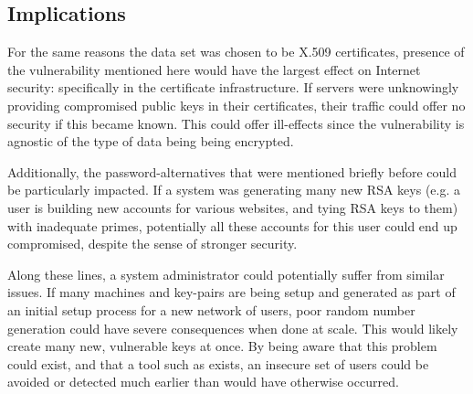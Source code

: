 \documentclass[12pt]{ucthesis}
\begin{document}
\subsection{Implications}
For the same reasons the data set was chosen to be X.509 certificates, presence
of the vulnerability mentioned here would have the largest effect on Internet
security: specifically in the certificate infrastructure. If servers were
unknowingly providing compromised public keys in their certificates, their
traffic could offer no security if this became known. This could offer
ill-effects since the vulnerability is agnostic of the type of data being
being encrypted.

Additionally, the password-alternatives that were mentioned briefly before
could be particularly impacted. If a system was generating many new RSA keys
(e.g. a user is building new accounts for various websites, and tying RSA keys
to them) with inadequate primes, potentially all these accounts for this user
could end up compromised, despite the sense of stronger security.

Along these lines, a system administrator could potentially suffer from similar
issues. If many machines and key-pairs are being setup and generated as part of
an initial setup process for a new network of users, poor random number
generation could have severe consequences when done at scale. This would likely
create many new, vulnerable keys at once. By being aware that this problem
could exist, and that a tool such as \cite{scharfglass2012breaking} exists, an
insecure set of users could be avoided or detected much earlier than would have
otherwise occurred.
\end{document}
